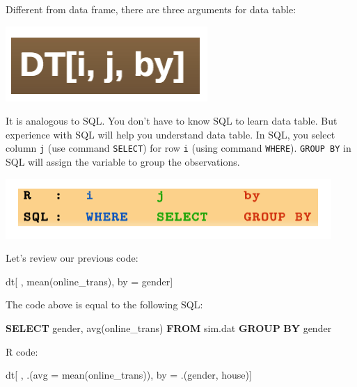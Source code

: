 \documentclass[
  12pt,
]{krantz}
\makeatletter
\newenvironment{Shaded}{\begin{snugshade}}{\end{snugshade}}
\newcommand{\AttributeTok}[1]{\textcolor[rgb]{0.61,0.61,0.61}{#1}}
\newcommand{\FunctionTok}[1]{\textcolor[rgb]{0,0,0}{#1}}
\newcommand{\KeywordTok}[1]{\textcolor[rgb]{0.27,0.27,0.27}{\textbf{#1}}}
\newcommand{\NormalTok}[1]{#1}
\newcommand{\OtherTok}[1]{\textcolor[rgb]{0.37,0.37,0.37}{#1}}
\newenvironment{kframe}{%
\medskip{}
\setlength{\fboxsep}{.8em}
 \def\at@end@of@kframe{}%
 \ifinner\ifhmode%
  \def\at@end@of@kframe{\end{minipage}}%
  \begin{minipage}{\columnwidth}%
 \fi\fi%
 \def\FrameCommand##1{\hskip\@totalleftmargin \hskip-\fboxsep
 \colorbox{shadecolor}{##1}\hskip-\fboxsep
     \hskip-\linewidth \hskip-\@totalleftmargin \hskip\columnwidth}%
 \MakeFramed {\advance\hsize-\width
   \@totalleftmargin\z@ \linewidth\hsize
   \@setminipage}}%
 {\par\unskip\endMakeFramed%
 \at@end@of@kframe}
\renewenvironment{Shaded}{\begin{kframe}}{\end{kframe}}
\makeatother
\begin{document}
Different from data frame, there are three arguments for data table:

\includegraphics{images/datable1.png}

It is analogous to SQL. You don't have to know SQL to learn data table. But experience with SQL will help you understand data table. In SQL, you select column \texttt{j} (use command \texttt{SELECT}) for row \texttt{i} (using command \texttt{WHERE}). \texttt{GROUP\ BY} in SQL will assign the variable to group the observations.

\includegraphics{images/rSQL.png}

Let's review our previous code:

\begin{Shaded}
\begin{Highlighting}[]
\NormalTok{dt[ , }\FunctionTok{mean}\NormalTok{(online\_trans), by }\OtherTok{=}\NormalTok{ gender]}
\end{Highlighting}
\end{Shaded}

The code above is equal to the following SQL:

\begin{Shaded}
\begin{Highlighting}[]
\KeywordTok{SELECT}
\NormalTok{   gender,}
   \FunctionTok{avg}\NormalTok{(online\_trans) }
\KeywordTok{FROM}
\NormalTok{   sim.dat }
\KeywordTok{GROUP} \KeywordTok{BY}
\NormalTok{   gender}
\end{Highlighting}
\end{Shaded}

R code:

\begin{Shaded}
\begin{Highlighting}[]
\NormalTok{dt[ , .(}\AttributeTok{avg =} \FunctionTok{mean}\NormalTok{(online\_trans)), by }\OtherTok{=}\NormalTok{ .(gender, house)]}
\end{Highlighting}
\end{Shaded}
\end{document}

